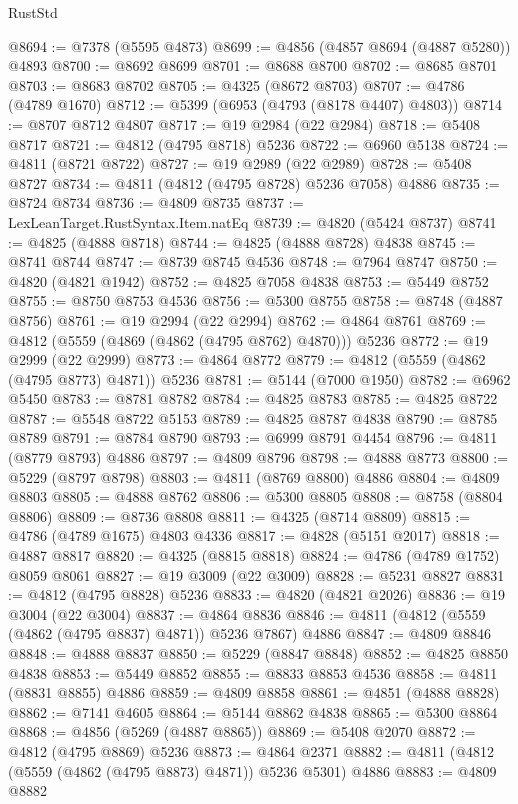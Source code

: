 \begin{lexlean}{RustStd}
\begin{coremodule}
@8694 := @7378 (@5595 @4873)
@8699 := @4856 (@4857 @8694 (@4887 @5280)) @4893
@8700 := @8692 @8699
@8701 := @8688 @8700
@8702 := @8685 @8701
@8703 := @8683 @8702
@8705 := @4325 (@8672 @8703)
@8707 := @4786 (@4789 @1670)
@8712 := @5399 (@6953 (@4793 (@8178 @4407) @4803))
@8714 := @8707 @8712 @4807
@8717 := @19 @2984 (@22 @2984)
@8718 := @5408 @8717
@8721 := @4812 (@4795 @8718) @5236
@8722 := @6960 @5138
@8724 := @4811 (@8721 @8722)
@8727 := @19 @2989 (@22 @2989)
@8728 := @5408 @8727
@8734 := @4811 (@4812 (@4795 @8728) @5236 @7058) @4886
@8735 := @8724 @8734
@8736 := @4809 @8735
@8737 := LexLeanTarget.RustSyntax.Item.natEq
@8739 := @4820 (@5424 @8737)
@8741 := @4825 (@4888 @8718)
@8744 := @4825 (@4888 @8728) @4838
@8745 := @8741 @8744
@8747 := @8739 @8745 @4536
@8748 := @7964 @8747
@8750 := @4820 (@4821 @1942)
@8752 := @4825 @7058 @4838
@8753 := @5449 @8752
@8755 := @8750 @8753 @4536
@8756 := @5300 @8755
@8758 := @8748 (@4887 @8756)
@8761 := @19 @2994 (@22 @2994)
@8762 := @4864 @8761
@8769 := @4812 (@5559 (@4869 (@4862 (@4795 @8762) @4870))) @5236
@8772 := @19 @2999 (@22 @2999)
@8773 := @4864 @8772
@8779 := @4812 (@5559 (@4862 (@4795 @8773) @4871)) @5236
@8781 := @5144 (@7000 @1950)
@8782 := @6962 @5450
@8783 := @8781 @8782
@8784 := @4825 @8783
@8785 := @4825 @8722
@8787 := @5548 @8722 @5153
@8789 := @4825 @8787 @4838
@8790 := @8785 @8789
@8791 := @8784 @8790
@8793 := @6999 @8791 @4454
@8796 := @4811 (@8779 @8793) @4886
@8797 := @4809 @8796
@8798 := @4888 @8773
@8800 := @5229 (@8797 @8798)
@8803 := @4811 (@8769 @8800) @4886
@8804 := @4809 @8803
@8805 := @4888 @8762
@8806 := @5300 @8805
@8808 := @8758 (@8804 @8806)
@8809 := @8736 @8808
@8811 := @4325 (@8714 @8809)
@8815 := @4786 (@4789 @1675) @4803 @4336
@8817 := @4828 (@5151 @2017)
@8818 := @4887 @8817
@8820 := @4325 (@8815 @8818)
@8824 := @4786 (@4789 @1752) @8059 @8061
@8827 := @19 @3009 (@22 @3009)
@8828 := @5231 @8827
@8831 := @4812 (@4795 @8828) @5236
@8833 := @4820 (@4821 @2026)
@8836 := @19 @3004 (@22 @3004)
@8837 := @4864 @8836
@8846 := @4811 (@4812 (@5559 (@4862 (@4795 @8837) @4871)) @5236 @7867) @4886
@8847 := @4809 @8846
@8848 := @4888 @8837
@8850 := @5229 (@8847 @8848)
@8852 := @4825 @8850 @4838
@8853 := @5449 @8852
@8855 := @8833 @8853 @4536
@8858 := @4811 (@8831 @8855) @4886
@8859 := @4809 @8858
@8861 := @4851 (@4888 @8828)
@8862 := @7141 @4605
@8864 := @5144 @8862 @4838
@8865 := @5300 @8864
@8868 := @4856 (@5269 (@4887 @8865))
@8869 := @5408 @2070
@8872 := @4812 (@4795 @8869) @5236
@8873 := @4864 @2371
@8882 := @4811 (@4812 (@5559 (@4862 (@4795 @8873) @4871)) @5236 @5301) @4886
@8883 := @4809 @8882

\end{coremodule}
\end{lexlean}
